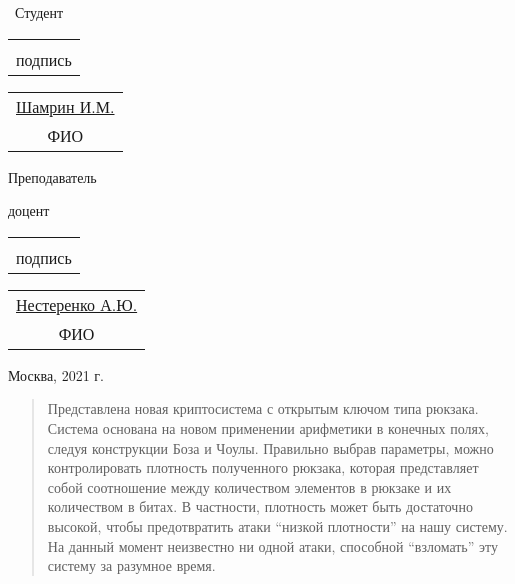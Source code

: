 \documentclass[a4paper,12pt]{article}
\begin{document}
\begin{multicols}{2}
\begin{flushleft}
~Студент\par\:\par
\begin{tabular}{c}
\underline{\hspace{8em}} \vspace{-2mm}\\
{\tiny {\color{graylight}подпись}}
\end{tabular}
\begin{tabular}{c}
\underline{\hspace{2em}Шамрин И.М.\hspace{1em}}\\
{\tiny{\color{graylight} ФИО}}
\end{tabular}
\end{flushleft}

\begin{flushright}
Преподаватель

доцент
\end{flushright}

\begin{tabular}{c}
\underline{\hspace{8em}} \vspace{-1mm}\\
{\tiny {\color{graylight}подпись}}
\end{tabular}
\begin{tabular}{c}
\underline{\hspace{2em}Нестеренко А.Ю.\hspace{1em}} \vspace{-1mm}\\
{\tiny{\color{graylight} ФИО}}
\end{tabular}
\end{multicols}

\vfill
\begin{center}Москва, 2021 г.\end{center}

\newpage

\tableofcontents

\newpage
\begin{abstract}
Представлена новая криптосистема с открытым ключом типа рюкзака. Система основана на новом применении арифметики в конечных полях, следуя конструкции Боза и Чоулы. Правильно выбрав параметры, можно контролировать плотность полученного рюкзака, которая представляет собой соотношение между количеством элементов в рюкзаке и их количеством в битах. В частности, плотность может быть достаточно высокой, чтобы предотвратить атаки “низкой плотности” на нашу систему. На данный момент неизвестно ни одной атаки, способной “взломать” эту систему за разумное время. 
\end{abstract}
\end{document}
